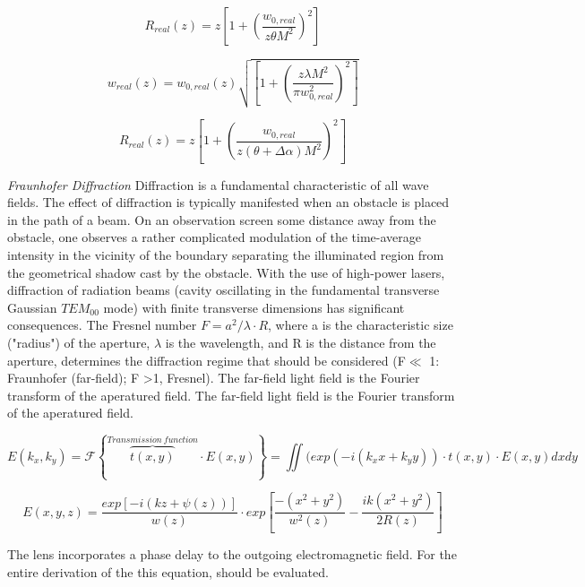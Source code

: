 \begin{equation}
R_{real}(z)=z\left[1 + \left(\frac{w_{0,real}}{z\theta M^{2}}\right)^{2}\right]
\end{equation}

\begin{equation}
w_{real}(z)=w_{0,real}(z)\sqrt{\left[1 + \left(\frac{z\lambda M^{2}}{\pi w_{0,real}^{2}}\right)^{2}\right]}
\end{equation}

\begin{equation}
R_{real}(z)=z\left[1 + \left(\frac{w_{0,real}}{z(\theta+\Delta \alpha) M^{2}}\right)^{2}\right]
\end{equation}

\textit{Fraunhofer Diffraction} 
Diffraction is a fundamental characteristic of all wave fields. The effect of diffraction is typically manifested when an obstacle is placed in the path of a beam. On an observation screen some distance away from the obstacle, one observes a rather complicated modulation of the time-average intensity in the vicinity of the boundary separating the illuminated region from the geometrical shadow cast by the obstacle. With the use of high-power lasers, diffraction of radiation beams (cavity oscillating in the fundamental transverse Gaussian $TEM_{00}$ mode) with finite transverse dimensions has significant consequences. The Fresnel number $F = a^{2}/\lambda \cdot R$, where a is the characteristic size ("radius") of the aperture,  $\lambda$ is the wavelength, and R is the distance from the aperture, determines the diffraction regime that should be considered (F$\ll$ 1: Fraunhofer (far-field); F \textgreater 1, Fresnel). The far-field light field is the Fourier transform of the aperatured field. The far-field light field is the Fourier transform of the aperatured field.
	
\begin{equation} 
E(k_{x},k_{y}) = \mathcal{F}\left\{{\overbrace{t(x,y)}^{Transmission\  function}\cdot E(x,y)}\right\} = \iint(exp(-i(k_{x} x + k_{y}y))\cdot t(x,y)\cdot E(x,y)dxdy 
\end{equation} 

\begin{equation}
E(x,y,z) = \frac{exp\left[-i(kz + \psi(z))\right]}{w(z)}\cdot exp\left[\frac{-(x^{2}+y^{2})}{w^{2}(z)}-\frac{ik(x^{2}+y^{2})}{2R(z)}\right]
\end{equation}

The lens incorporates a phase delay to the outgoing electromagnetic field. For the entire derivation of the this equation, \cite{laser_power} should be evaluated. 

